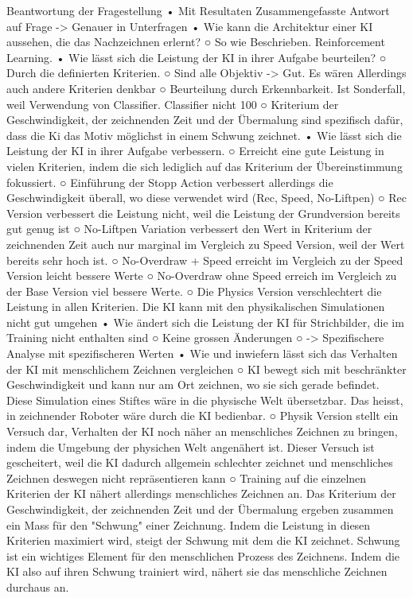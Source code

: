 Beantwortung der Fragestellung
	• Mit Resultaten Zusammengefasste Antwort auf Frage -> Genauer in Unterfragen
	• Wie kann die Architektur einer KI aussehen, die das Nachzeichnen erlernt?
		○ So wie Beschrieben. Reinforcement Learning. 
	• Wie lässt sich die Leistung der KI in ihrer Aufgabe beurteilen?
		○ Durch die definierten Kriterien. 
		○ Sind alle Objektiv -> Gut. Es wären Allerdings auch andere Kriterien denkbar
		○ Beurteilung durch Erkennbarkeit. Ist Sonderfall, weil Verwendung von Classifier. Classifier nicht 100%
		○ Kriterium der Geschwindigkeit, der zeichnenden Zeit und der Übermalung sind spezifisch dafür, dass die Ki das Motiv möglichst in einem Schwung zeichnet.
	• Wie lässt sich die Leistung der KI in ihrer Aufgabe verbessern. 
		○ Erreicht eine gute Leistung in vielen Kriterien, indem die sich lediglich auf das Kriterium der Übereinstimmung fokussiert.
		○ Einführung der Stopp Action verbessert allerdings die Geschwindigkeit überall, wo diese verwendet wird (Rec, Speed, No-Liftpen)
		○ Rec Version verbessert die Leistung nicht, weil die Leistung der Grundversion bereits gut genug ist
		○ No-Liftpen Variation verbessert den Wert in Kriterium der zeichnenden Zeit auch nur marginal im Vergleich zu Speed Version, weil der Wert bereits sehr hoch ist.
		○ No-Overdraw + Speed erreicht im Vergleich zu der Speed Version leicht bessere Werte
		○ No-Overdraw ohne Speed erreich im Vergleich zu der Base Version viel bessere Werte.
		○ Die Physics Version verschlechtert die Leistung in allen Kriterien. Die KI kann mit den physikalischen Simulationen nicht gut umgehen
	• Wie ändert sich die Leistung der KI für Strichbilder, die im Training nicht enthalten sind
		○ Keine grossen Änderungen
		○ -> Spezifischere Analyse mit spezifischeren Werten
	• Wie und inwiefern lässt sich das Verhalten der KI mit menschlichem Zeichnen vergleichen
		○ KI bewegt sich mit beschränkter Geschwindigkeit und kann nur am Ort zeichnen, wo sie sich gerade befindet. Diese Simulation eines Stiftes wäre in die physische Welt übersetzbar. Das heisst, in zeichnender Roboter wäre durch die KI bedienbar.
		○ Physik Version stellt ein Versuch dar, Verhalten der KI noch näher an menschliches Zeichnen zu bringen, indem die Umgebung der physichen Welt angenähert ist. Dieser Versuch ist gescheitert, weil die KI dadurch allgemein schlechter zeichnet und menschliches Zeichnen deswegen nicht repräsentieren kann
		○ Training auf die einzelnen Kriterien der KI nähert allerdings menschliches Zeichnen an. Das Kriterium der Geschwindigkeit, der zeichnenden Zeit und der Übermalung ergeben zusammen ein Mass für den "Schwung" einer Zeichnung. Indem die Leistung in diesen Kriterien maximiert wird, steigt der Schwung mit dem die KI zeichnet. Schwung ist ein wichtiges Element für den menschlichen Prozess des Zeichnens. Indem die KI also auf ihren Schwung trainiert wird, nähert sie das menschliche Zeichnen durchaus an.
